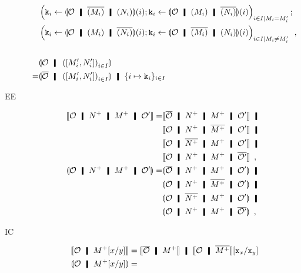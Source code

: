 \begin{description}
\begin{align*}
       &\left(\p k_i\leftarrow
       \semoi{\hypert\hmid \overline{(M_i)}\hmid
       (N_i)}(i)
       ; \p k_i \leftarrow \semoi{\hypert\hmid {(M_i)}\hmid
       \overline{(N_i)}}(i)\right)_{i\in I\mid M_i =
       M'_i};
       \\ &
       \left(\p k_i\leftarrow
       \semoi{\hypert\hmid {(M_i)}\hmid
       \overline{(N_i)}}(i)
       ; \p k_i \leftarrow
       \semoi{\hypert\hmid \overline{(M_i)}\hmid
       (N_i)}(i)
       \right)_{i\in I\mid M_i \neq
       M'_i}\enspace,\\ \\
       &\semoi{ \hypert \hmid \left(\cotuple{M'_i,N'_i}\right)_{i\in I}
       } \\
       = &
       \semoi{\overline{\hypert}\hmid \left(\cotuple{M'_i,N'_i}\right)_{i \in I}}
       \hmid \{i\mapsto \p k_i\}_{i\in I}
      \end{align*}
 \item[EE]
      \begin{align*}
       \semo{\hypert \hmid \m{N} \hmid \m{M} \hmid \hypert'}
       =&
       \semo{\overline{\hypert}\hmid \m{N}\hmid \m{M}\hmid \hypert'}
       \hmid \\
       &
       \semo{{\hypert}\hmid \m{N}\hmid \overline{\m{M}}\hmid \hypert'}
       \hmid \\
       &
       \semo{{\hypert}\hmid \overline{\m{N}}\hmid \m{M}\hmid \hypert'}
       \hmid \\
       &
       \semo{{\hypert}\hmid \m{N}\hmid \m{M}\hmid
       \overline{\hypert'}}\enspace,\\
       \semoi{\hypert \hmid \m{N} \hmid \m{M} \hmid \hypert'}
       =&
       \semoi{\overline{\hypert}\hmid \m{N}\hmid \m{M}\hmid \hypert'}
       \hmid \\
       &
       \semoi{{\hypert}\hmid \m{N}\hmid \overline{\m{M}}\hmid \hypert'}
       \hmid \\
       &
       \semoi{{\hypert}\hmid \overline{\m{N}}\hmid \m{M}\hmid \hypert'}
       \hmid \\
       &
       \semoi{{\hypert}\hmid \m{N}\hmid \m{M}\hmid
       \overline{\hypert'}}\enspace,
      \end{align*}
 \item[IC]
      \begin{align*}
       \semo{\hypert\hmid \m{M}[x/y]}&=
       \semo{\overline{\hypert}\hmid \m{M}} \hmid
       \semo{{\hypert}\hmid \overline{\m{M}}}[\p x_x/ \p x_y]\\
       \semoi{\hypert\hmid \m{M}[x/y]}&=

\end{align*}
\end{description}
